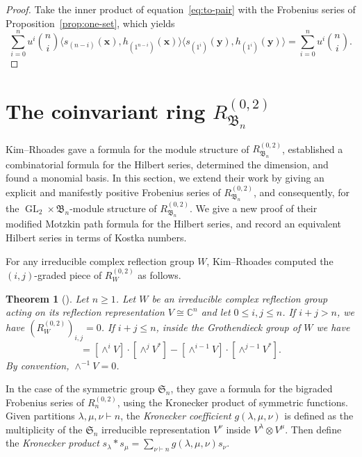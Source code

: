 \documentclass[12pt]{amsart}
\theoremstyle{plain}
\newtheorem{theorem}{Theorem}[section]
\theoremstyle{definition}
\DeclareMathOperator{\GL}{GL}
\newcommand{\C}{\mathbb{C}}
\newcommand{\x}{\mathbf{x}}
\newcommand{\y}{\mathbf{y}}
\begin{document}
\begin{proof}
    Take the inner product of equation~\eqref{eq:to-pair} with the Frobenius series of Proposition~\ref{prop:one-set}, which yields
    \begin{equation}
        \sum_{i=0}^n u^i \binom{n}{i} \langle s_{(n-i)}(\x), h_{(1^{n-i})}(\x)\rangle \langle s_{(1^i)}(\y), h_{(1^i)}(\y)\rangle = \sum_{i=0}^n u^i \binom{n}{i}.
    \end{equation}
\end{proof}

\section{The coinvariant ring \texorpdfstring{$R_{\mathfrak{B}_n}^{(0,2)}$}{RBn(0,2)}}\label{sec:02}
Kim--Rhoades gave a formula for the module structure of $R_{\mathfrak{B}_n}^{(0,2)}$, established a combinatorial formula for the Hilbert series, determined the dimension, and found a monomial basis.
In this section, we extend their work by giving an explicit and manifestly positive Frobenius series of $R_{\mathfrak{B}_n}^{(0,2)}$, and consequently, for the $\GL_2 \times \mathfrak{B}_n$-module structure of $R_{\mathfrak{B}_n}^{(0,2)}$.
We give a new proof of their modified Motzkin path formula for the Hilbert series, and record an equivalent Hilbert series in terms of Kostka numbers.

For any irreducible complex reflection group $W$, Kim--Rhoades computed the $(i,j)$-graded piece of $R_W^{(0,2)}$ as follows.
\begin{theorem}[{\cite[Theorem 4.2]{MR4381935}}]\label{thm:KR}
Let $n \geq 1$.
Let $W$ be an irreducible complex reflection group acting on its reflection representation $V \cong \C^n$ and let $0 \leq i,j \leq n$.
If $i+j > n$, we have $(R_W^{(0,2)})_{i,j} = 0$. If $i+j \leq n$, inside the Grothendieck group of $W$ we have
\begin{equation}
    [(R_W^{(0,2)})_{i,j}] = [\wedge^i V] \cdot [\wedge^j V^*] - [\wedge^{i-1} V] \cdot [\wedge^{j-1} V^*].
\end{equation}
By convention, $\wedge^{-1} V = 0$.
\end{theorem}

In the case of the symmetric group $\mathfrak{S}_n$, they gave a formula for the bigraded Frobenius series of $R_n^{(0,2)}$, using the Kronecker product of symmetric functions. 
Given partitions $\lambda, \mu, \nu \vdash n$, the \emph{Kronecker coefficient} $g(\lambda, \mu, \nu)$ is defined as the multiplicity of the $\mathfrak{S}_n$ irreducible representation $V^\nu$ inside $V^\lambda \otimes V^\mu$. 
Then define the \emph{Kronecker product} $s_\lambda * s_\mu = \sum_{\nu \vdash n} g(\lambda, \mu, \nu) s_\nu$.
\end{document}
